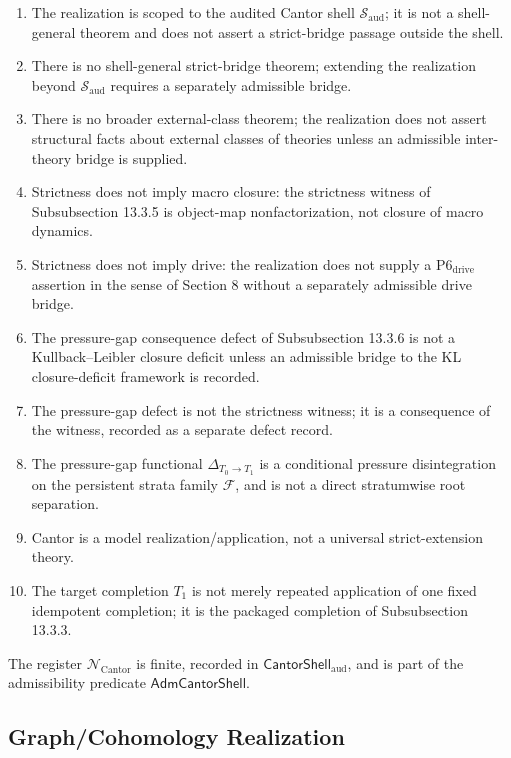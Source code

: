 \documentclass[11pt]{article}
\providecommand{\tightlist}{}
\theoremstyle{definition}
\begin{document}
\begin{enumerate}
\def\labelenumi{\arabic{enumi}.}
\tightlist
\item
  The realization is scoped to the audited Cantor shell \(\mathcal S_{\mathrm{aud}}\); it is not a shell-general theorem and does not assert a strict-bridge passage outside the shell.
\item
  There is no shell-general strict-bridge theorem; extending the realization beyond \(\mathcal S_{\mathrm{aud}}\) requires a separately admissible bridge.
\item
  There is no broader external-class theorem; the realization does not assert structural facts about external classes of theories unless an admissible inter-theory bridge is supplied.
\item
  Strictness does not imply macro closure: the strictness witness of Subsubsection 13.3.5 is object-map nonfactorization, not closure of macro dynamics.
\item
  Strictness does not imply drive: the realization does not supply a \(\mathrm{P6}_{\mathrm{drive}}\) assertion in the sense of Section 8 without a separately admissible drive bridge.
\item
  The pressure-gap consequence defect of Subsubsection 13.3.6 is not a Kullback--Leibler closure deficit unless an admissible bridge to the KL closure-deficit framework is recorded.
\item
  The pressure-gap defect is not the strictness witness; it is a consequence of the witness, recorded as a separate defect record.
\item
  The pressure-gap functional \(\Delta_{T_0\to T_1}\) is a conditional pressure disintegration on the persistent strata family \(\mathcal F\), and is not a direct stratumwise root separation.
\item
  Cantor is a model realization/application, not a universal strict-extension theory.
\item
  The target completion \(T_1\) is not merely repeated application of one fixed idempotent completion; it is the packaged completion of Subsubsection 13.3.3.
\end{enumerate}

The register \(\mathcal N_{\mathrm{Cantor}}\) is finite, recorded in \(\mathsf{CantorShell}_{\mathrm{aud}}\), and is part of the admissibility predicate \(\mathsf{AdmCantorShell}\).

\subsection{Graph/Cohomology Realization}
\end{document}
